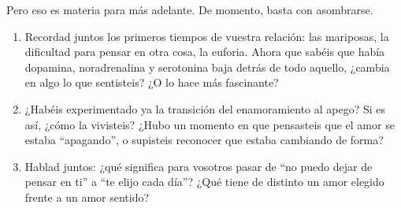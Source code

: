 Pero eso es materia para más adelante. De momento, basta con asombrarse.

\paracaminar

\begin{enumerate}
  \item Recordad juntos los primeros tiempos de vuestra relación: las mariposas, la dificultad para pensar en otra cosa, la euforia. Ahora que sabéis que había dopamina, noradrenalina y serotonina baja detrás de todo aquello, ¿cambia en algo lo que sentisteis? ¿O lo hace más fascinante?

  \item ¿Habéis experimentado ya la transición del enamoramiento al apego? Si es así, ¿cómo la vivisteis? ¿Hubo un momento en que pensasteis que el amor se estaba ``apagando'', o supisteis reconocer que estaba cambiando de forma?

  \item Hablad juntos: ¿qué significa para vosotros pasar de ``no puedo dejar de pensar en ti'' a ``te elijo cada día''? ¿Qué tiene de distinto un amor elegido frente a un amor sentido?
\end{enumerate}

